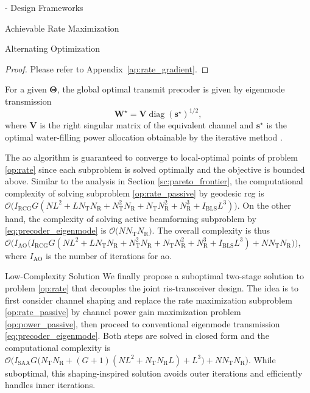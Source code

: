 \documentclass[journal]{IEEEtran}
\DeclareMathOperator{\diag}{diag}
\begin{document}
\begin{section}{- Design Frameworks}
\begin{subsection}{Achievable Rate Maximization}
\begin{subsubsection}{Alternating Optimization}
			\begin{proof}
				Please refer to Appendix~\ref{ap:rate_gradient}.
			\end{proof}
			For a given $\mathbf{\Theta}$, the global optimal transmit precoder is given by eigenmode transmission \cite{Clerckx2013}
			\begin{equation}
				\mathbf{W}^\star = \mathbf{V} {\diag(\mathbf{s}^\star)}^{1/2},
				\label{eq:precoder_eigenmode}
			\end{equation}
			where $\mathbf{V}$ is the right singular matrix of the equivalent channel and $\mathbf{s}^\star$ is the optimal water-filling power allocation obtainable by the iterative method \cite{Tse2005}.

			The \gls{ao} algorithm is guaranteed to converge to local-optimal points of problem \eqref{op:rate} since each subproblem is solved optimally and the objective is bounded above.
			Similar to the analysis in Section \ref{sc:pareto_frontier}, the computational complexity of solving subproblem \eqref{op:rate_passive} by geodesic \gls{rcg} is $\mathcal{O}\bigl(I_\text{RCG} G (NL^2 + L N_\mathrm{T} N_\mathrm{R} + N_\mathrm{T}^2 N_\mathrm{R} + N_\mathrm{T} N_\mathrm{R}^2 + N_\mathrm{R}^3 + I_\text{BLS} L^3)\bigr)$.
			On the other hand, the complexity of solving active beamforming subproblem by \eqref{eq:precoder_eigenmode} is $\mathcal{O}\bigl(N N_\mathrm{T} N_\mathrm{R}\bigr)$.
			The overall complexity is thus $\mathcal{O}\bigl(I_\text{AO}\bigl(I_\text{RCG} G (NL^2 + L N_\mathrm{T} N_\mathrm{R} + N_\mathrm{T}^2 N_\mathrm{R} + N_\mathrm{T} N_\mathrm{R}^2 + N_\mathrm{R}^3 + I_\text{BLS} L^3) + N N_\mathrm{T} N_\mathrm{R}\bigr)\bigr)$, where $I_\text{AO}$ is the number of iterations for \gls{ao}.
		\end{subsubsection}

		\begin{subsubsection}{Low-Complexity Solution}\label{sc:low_complexity}
			We finally propose a suboptimal two-stage solution to problem \eqref{op:rate} that decouples the joint \gls{ris}-transceiver design.
			The idea is to first consider channel shaping and replace the rate maximization subproblem \eqref{op:rate_passive} by channel power gain maximization problem \eqref{op:power_passive}, then proceed to conventional eigenmode transmission \eqref{eq:precoder_eigenmode}.
			Both steps are solved in closed form and the computational complexity is $\mathcal{O}\bigl(I_\text{SAA} G \bigl(N_\mathrm{T} N_\mathrm{R} + (G+1)(NL^2+N_\mathrm{T} N_\mathrm{R} L) + L^3\bigr) + N N_\mathrm{T} N_\mathrm{R}\bigr)$.
			While suboptimal, this shaping-inspired solution avoids outer iterations and efficiently handles inner iterations.
		\end{subsubsection}
	\end{subsection}
\end{section}
\end{document}
